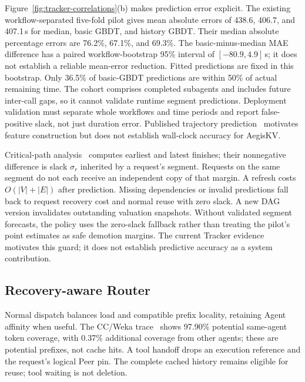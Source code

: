 Figure~\ref{fig:tracker-correlations}(b) makes prediction error explicit.
The existing workflow-separated five-fold pilot gives mean absolute
errors of 438.6, 406.7, and 407.1\,s for median, basic GBDT, and
history GBDT. Their median absolute percentage errors are 76.2\%,
67.1\%, and 69.3\%. The basic-minus-median MAE difference has a paired
workflow-bootstrap 95\% interval of $[-80.9,4.9]$\,s; it does not
establish a reliable mean-error reduction. Fitted predictions are fixed
in this bootstrap. Only 36.5\% of basic-GBDT predictions are within 50\%
of actual remaining time. The cohort comprises completed subagents and
includes future inter-call gaps, so it cannot validate runtime segment
predictions. Deployment validation must separate whole workflows and
time periods and report false-positive slack, not just duration error.
Published trajectory
prediction~\cite{zhang2026heddle} motivates feature construction but does
not establish wall-clock accuracy for AegisKV.

Critical-path analysis~\cite{kelley1959cpm} computes earliest and latest
finishes; their nonnegative difference is slack $\sigma_r$ inherited by a
request's segment. Requests on the same segment do not each receive an
independent copy of that margin. A refresh costs $O(|V|+|E|)$ after
prediction. Missing dependencies or invalid predictions fall back to
request recovery cost and normal reuse with zero slack. A new DAG version
invalidates outstanding valuation snapshots.
Without validated segment forecasts, the policy uses the zero-slack
fallback rather than treating the pilot's point estimates as safe
demotion margins. The current Tracker evidence motivates this guard;
it does not establish predictive accuracy as a system contribution.



\subsection{Recovery-aware Router}
\label{sec:recovery-router}

Normal dispatch balances load and compatible prefix locality, retaining
Agent affinity when useful. The CC/Weka trace~\cite{semianalysis2026cctraces}
shows 97.90\% potential same-agent token coverage, with 0.37\% additional
coverage from other agents; these are potential prefixes, not cache hits. A tool handoff drops
an execution reference and the request's logical Peer pin. The complete
cached history remains eligible for reuse; tool waiting is not deletion.

